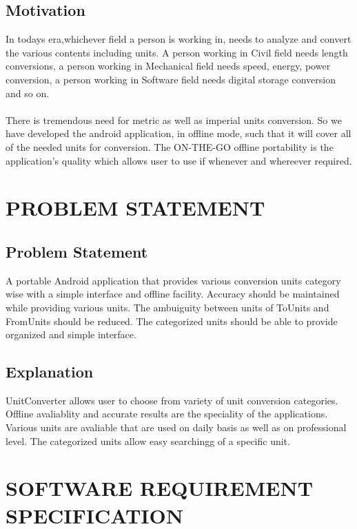 \documentclass[a4paper, 12pt]{report}
\begin{document}
\section{Motivation}
\hspace{0.8cm}
In todays era,whichever field a person is working in, needs to analyze and convert the various contents including units. A person working in Civil field needs length conversions, a person working in Mechanical field needs speed, energy, power conversion, a person working in Software field needs digital storage conversion and so on. \\\\
\hspace*{0.8cm}There is tremendous need for metric as well as imperial units conversion. So we have developed the android application, in offline mode, such that it will cover all of the needed units for conversion. The ON-THE-GO offline portability is the application's quality which allows user to use if whenever and whereever required.
\chapter{PROBLEM  STATEMENT}
\section{Problem Statement}
\hspace{0.8cm}A portable Android application that provides various conversion units category wise with a simple interface and offline facility. Accuracy should be maintained while providing various units. The ambuiguity between units of ToUnits and FromUnits should be reduced. The categorized units should be able to provide organized and simple interface.\\
\section{Explanation}
\hspace{0.8cm}UnitConverter allows user to choose from variety of unit conversion categories.  Offline avaliablity and accurate results are the speciality of the applications. Various units are avaliable that are used on daily basis as well as on professional level. The categorized units allow easy searchingg of a specific unit.
\chapter{SOFTWARE REQUIREMENT SPECIFICATION}
\end{document}
